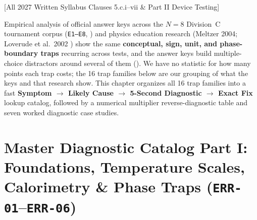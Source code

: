 [All 2027 Written Syllabus Clauses 5.c.i--vii \& Part II Device Testing]

Empirical analysis of official answer keys across the $N = 8$ Division~C tournament corpus (\texttt{E1--E8}, )  and physics education research (Meltzer 2004; Loverude et al.\ 2002 ) show the same \textbf{conceptual, sign, unit, and phase-boundary traps} recurring across tests, and the answer keys build multiple-choice distractors around several of them (). We have no statistic for how many points each trap costs; the 16 trap families below are our grouping of what the keys and that research show. This chapter organizes all 16 trap families into a fast \textbf{Symptom $\to$ Likely Cause $\to$ 5-Second Diagnostic $\to$ Exact Fix} lookup catalog, followed by a numerical multiplier reverse-diagnostic table and seven worked diagnostic case studies.

\section{Master Diagnostic Catalog Part I: Foundations, Temperature Scales, Calorimetry \& Phase Traps (\texttt{ERR-01}--\texttt{ERR-06})}\label{sec:20.1}

